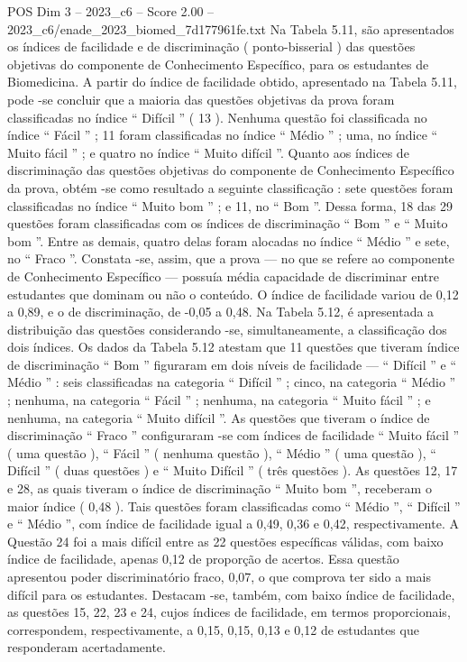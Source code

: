 \begin{textsample}{POS Dim 3 – 2023\_c6 – Score 2.00 – 2023\_c6/enade\_2023\_biomed\_7d177961fe.txt}
Na Tabela 5.11, são apresentados os índices de facilidade e de discriminação ( ponto-bisserial ) das questões objetivas do componente de Conhecimento Específico, para os estudantes de Biomedicina.
A partir do índice de facilidade obtido, apresentado na Tabela 5.11, pode -se concluir que a maioria das questões objetivas da prova foram classificadas no índice “ Difícil ” ( 13 ).
Nenhuma questão foi classificada no índice “ Fácil ” ; 11 foram classificadas no índice “ Médio ” ; uma, no índice “ Muito fácil ” ; e quatro no índice “ Muito difícil ”.
Quanto aos índices de discriminação das questões objetivas do componente de Conhecimento Específico da prova, obtém -se como resultado a seguinte classificação : sete questões foram classificadas no índice “ Muito bom ” ; e 11, no “ Bom ”.
Dessa forma, 18 das 29 questões foram classificadas com os índices de discriminação “ Bom ” e “ Muito bom ”.
Entre as demais, quatro delas foram alocadas no índice “ Médio ” e sete, no “ Fraco ”.
Constata -se, assim, que a prova — no que se refere ao componente de Conhecimento Específico — possuía média capacidade de discriminar entre estudantes que dominam ou não o conteúdo.
O índice de facilidade variou de 0,12 a 0,89, e o de discriminação, de -0,05 a 0,48.
Na Tabela 5.12, é apresentada a distribuição das questões considerando -se, simultaneamente, a classificação dos dois índices.
Os dados da Tabela 5.12 atestam que 11 questões que tiveram índice de discriminação “ Bom ” figuraram em dois níveis de facilidade — “ Difícil ” e “ Médio ” : seis classificadas na categoria “ Difícil ” ; cinco, na categoria “ Médio ” ; nenhuma, na categoria “ Fácil ” ; nenhuma, na categoria “ Muito fácil ” ; e nenhuma, na categoria “ Muito difícil ”.
As questões que tiveram o índice de discriminação “ Fraco ” configuraram -se com índices de facilidade “ Muito fácil ” ( uma questão ), “ Fácil ” ( nenhuma questão ), “ Médio ” ( uma questão ), “ Difícil ” ( duas questões ) e “ Muito Difícil ” ( três questões ).
As questões 12, 17 e 28, as quais tiveram o índice de discriminação “ Muito bom ”, receberam o maior índice ( 0,48 ).
Tais questões foram classificadas como “ Médio ”, “ Difícil ” e “ Médio ”, com índice de facilidade igual a 0,49, 0,36 e 0,42, respectivamente.
A Questão 24 foi a mais difícil entre as 22 questões específicas válidas, com baixo índice de facilidade, apenas 0,12 de proporção de acertos.
Essa questão apresentou poder discriminatório fraco, 0,07, o que comprova ter sido a mais difícil para os estudantes.
Destacam -se, também, com baixo índice de facilidade, as questões 15, 22, 23 e 24, cujos índices de facilidade, em termos proporcionais, correspondem, respectivamente, a 0,15, 0,15, 0,13 e 0,12 de estudantes que responderam acertadamente.

\end{textsample}
